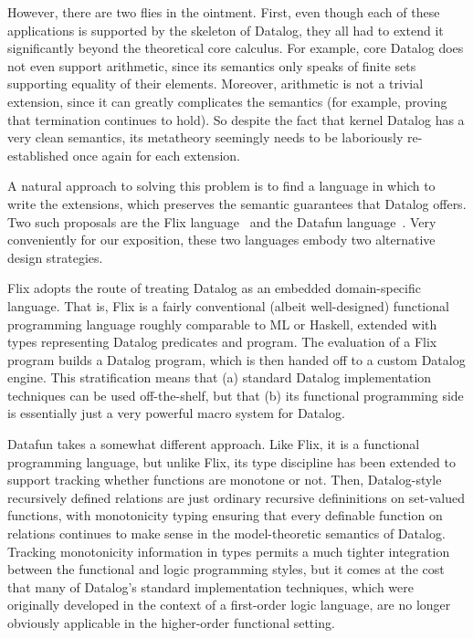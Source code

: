 
However, there are two flies in the ointment. First, even though each
of these applications is supported by the skeleton of Datalog, they
all had to extend it significantly beyond the theoretical core
calculus.  For example, core Datalog does not even support arithmetic,
since its semantics only speaks of finite sets supporting equality of
their elements. Moreover, arithmetic is not a trivial extension, since
it can greatly complicates the semantics (for example, proving that
termination continues to hold). So despite the fact that kernel
Datalog has a very clean semantics, its metatheory seemingly needs to
be laboriously re-established once again for each extension.

A natural approach to solving this problem is to find a language in
which to write the extensions, which preserves the semantic guarantees
that Datalog offers. Two such proposals are the Flix
language~\cite{flix} and the Datafun language~\cite{datafun}.  Very
conveniently for our exposition, these two languages embody two
alternative design strategies.

Flix adopts the route of treating Datalog as an embedded
domain-specific language. That is, Flix is a fairly conventional
(albeit well-designed) functional programming language roughly
comparable to ML or Haskell, extended with types representing Datalog
predicates and program. The evaluation of a Flix program builds a
Datalog program, which is then handed off to a custom Datalog engine.
This stratification means that (a) standard Datalog implementation
techniques can be used off-the-shelf, but that (b) its functional
programming side is essentially just a very powerful macro system for
Datalog.

Datafun takes a somewhat different approach. Like Flix, it is a
functional programming language, but unlike Flix, its type discipline
has been extended to support tracking whether functions are monotone
or not. Then, Datalog-style recursively defined relations are just
ordinary recursive defininitions on set-valued functions, with
monotonicity typing ensuring that every definable function on
relations continues to make sense in the model-theoretic semantics of
Datalog. Tracking monotonicity information in types permits a much
tighter integration between the functional and logic programming
styles, but it comes at the cost that many of Datalog's standard
implementation techniques, which were originally developed in the
context of a first-order logic language, are no longer obviously
applicable in the higher-order functional setting.

